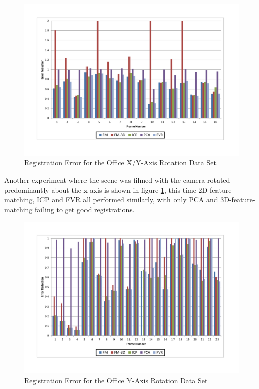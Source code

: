 \begin{figure}[t]
\centering
\includegraphics[width=6.0in]{images/results/Office_Texture_Rotate_XAxis}
\caption{Registration Error for the Office X/Y-Axis Rotation Data Set}
\label{fig:PET10}
\end{figure}

Another experiment where the scene was filmed with the camera rotated predominantly about the x-axis is shown in figure \ref{fig:PET10}, this time 2D-feature-matching, ICP and FVR all performed similarly, with only PCA and 3D-feature-matching failing to get good registrations. 

\begin{figure}[t]
\centering
\includegraphics[width=6.0in]{images/results/Office_Texture_Rotation}
\caption{Registration Error for the Office Y-Axis Rotation Data Set}
\label{fig:PET11}
\end{figure}

